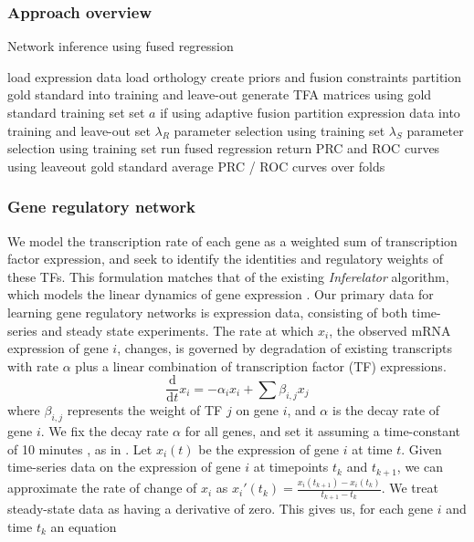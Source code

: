 \documentclass[11pt]{article}
\begin{document}
\subsubsection{Approach overview}
\begin{algorithm}
	\caption{Network inference using fused regression}\label{euclid}
	\begin{algorithmic}
\State load expression data
\State load orthology
\State create priors and fusion constraints
\State partition gold standard into training and leave-out
\State generate TFA matrices using gold standard training set
\State set $a$ if using adaptive fusion
	\State partition expression data into training and leave-out set
	\State $\lambda_R$ parameter selection using training set
	\State $\lambda_S$ parameter selection using training set
	\State run fused regression
	\State return PRC and ROC curves using leaveout gold standard
	\EndFor
\State average PRC / ROC curves over folds
\EndProcedure
\end{algorithmic}
\end{algorithm}


\subsubsection{Gene regulatory network}

We model the transcription rate of each gene as a weighted sum of transcription factor expression, and seek to identify the identities and regulatory weights of these TFs. 
This formulation matches that of the existing \textit{Inferelator} algorithm, which models the linear dynamics of gene expression \cite{bonneau_inferelator:_2006-1}. Our primary data for learning gene regulatory networks is expression data, consisting of both time-series and steady state experiments. 
The rate at which $x_{i}$, the observed mRNA expression of gene $i$, changes, is governed by degradation of existing transcripts with rate $\alpha$ plus a linear combination of transcription factor (TF) expressions. 
\begin{equation}
\frac{\mathrm d}{\mathrm d t} x_i = -\alpha_{i}x_{i} + \sum \beta_{i,j}x_{j}
\end{equation}
where $\beta_{i,j}$ represents the weight of TF $j$ on gene $i$, and $\alpha$ is the decay rate of gene $i$. We fix the decay rate $\alpha$ for all genes, and set it assuming a time-constant of 10 minutes \cite{hambraeus_genome-wide_2003, selinger_global_2003}, as in \cite{greenfield_robust_2013}. Let $x_i(t)$ be the expression of gene $i$ at time $t$. 
Given time-series data on the expression of gene $i$ at timepoints $t_k$ and $t_{k+1}$, we can approximate the rate of change of $x_i$ as $x_i'(t_k)=\frac{x_i(t_{k+1})-x_i(t_k)}{t_{k+1}-t_k}$. 
We treat steady-state data as having a derivative of zero. 
This gives us, for each gene $i$ and time $t_{k}$ an equation
\end{document}
